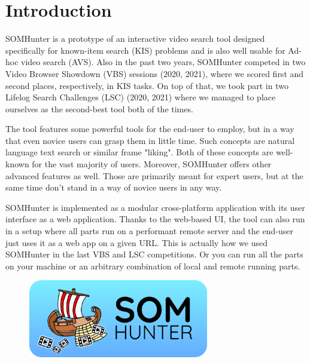 

\section{Introduction}

SOMHunter is a prototype of an interactive video search tool designed specifically for known-item search (KIS) problems and is also well usable for Ad-hoc video search (AVS). Also in the past two years, SOMHunter competed in two Video Browser Showdown (VBS) sessions (2020, 2021), where we scored first and second places, respectively, in KIS tasks. On top of that, we took part in two Lifelog Search Challenges (LSC) (2020, 2021) where we managed to place ourselves as the second-best tool both of the times.

The tool features some powerful tools for the end-user to employ, but in a way that even novice users can grasp them in little time. Such concepts are natural language text search or similar frame "liking". Both of these concepts are well-known for the vast majority of users. Moreover,  SOMHunter offers other advanced features as well. Those are primarily meant for expert users, but at the same time don't stand in a way of novice users in any way.

SOMHunter is implemented as a modular cross-platform application with its user interface as a web application. Thanks to the web-based UI, the tool can also run in a setup where all parts run on a performant remote server and the end-user just uses it as a web app on a given URL. This is actually how we used SOMHunter in the last VBS and LSC competitions. Or you can run all the parts on your machine or an arbitrary combination of local and remote running parts.

\begin{figure}[b]
	\centering
	\includegraphics[width=0.7\textwidth]{img/somhunter-logo.png}
	\label{fig:sh-arch}
\end{figure}

